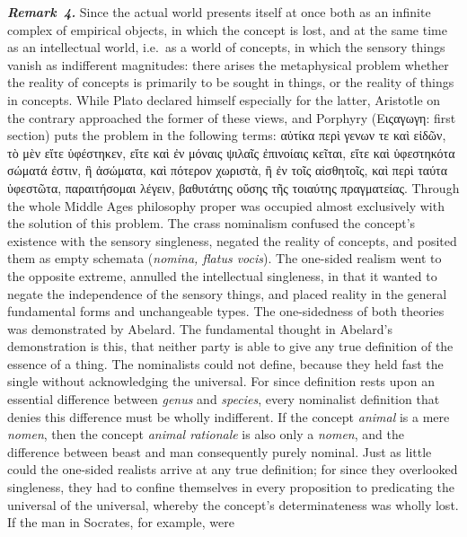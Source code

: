 \documentclass[12pt]{book}
\newcommand{\anm}[1]{\emph{\textbf{Remark~#1.}}}
\begin{document}
\anm{4} Since the actual world presents itself at once both as an infinite
complex of empirical objects, in which the concept is lost, and at the same
time as an intellectual world, i.e.\ as a world of concepts, in which the
sensory things vanish as indifferent magnitudes: there arises the
metaphysical problem whether the reality of concepts is primarily to be
sought in things, or the reality of things in concepts. While Plato declared
himself especially for the latter, Aristotle on the contrary approached the
former of these views, and Porphyry (Ειςαγωγη: first section) puts the
problem in the following terms: αὐτίκα περὶ γενων τε καὶ εἰδῶν, τὸ μὲν εἴτε
ὑφέστηκεν, εἴτε καὶ ἐν μόναις ψιλαῖς ἐπινοίαις κεῖται, εἴτε καὶ ὑφεστηκότα
σώματά ἐστιν, ἢ ἀσώματα, καὶ πότερον χωριστὰ, ἢ ἐν τοῖς αἰσθητοῖς, καὶ περὶ
ταύτα ὑφεστῶτα, παραιτήσομαι λέγειν, βαθυτάτης οὔσης τῆς τοιαύτης
πραγματείας. Through the whole Middle Ages philosophy proper was occupied
almost exclusively with the solution of this problem. The crass nominalism
confused the concept's existence with the sensory singleness, negated the
reality of concepts, and posited them as empty schemata (\textit{nomina,
flatus vocis}). The one-sided realism went to the opposite extreme, annulled
the intellectual singleness, in that it wanted to negate the independence of
the sensory things, and placed reality in the general fundamental forms and
unchangeable types. The one-sidedness of both theories was demonstrated by
Abelard. The fundamental thought in Abelard's demonstration is this, that
neither party is able to give any true definition of the essence of a thing.
The nominalists could not define, because they held fast the single without
acknowledging the universal. For since definition rests upon an essential
difference between \textit{genus} and \textit{species}, every nominalist
definition that denies this difference must be wholly indifferent. If the
concept \textit{animal} is a mere \textit{nomen}, then the concept
\textit{animal rationale} is also only a \textit{nomen}, and the difference
between beast and man consequently purely nominal. Just as little could the
one-sided realists arrive at any true definition; for since they overlooked
singleness, they had to confine themselves in every proposition to
predicating the universal of the universal, whereby the concept's
determinateness was wholly lost. If the man in Socrates, for example, were
\end{document}
